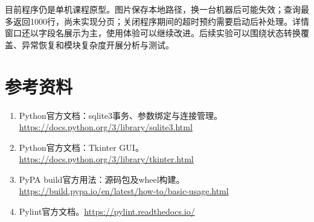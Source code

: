 \documentclass[11pt,a4paper]{ctexart}
\begin{document}
目前程序仍是单机课程原型。图片保存本地路径，换一台机器后可能失效；查询最多返回1000行，尚未实现分页；关闭程序期间的超时预约需要启动后补处理。详情窗口还以字段名展示为主，使用体验可以继续改进。后续实验可以围绕状态转换覆盖、异常恢复和模块复杂度开展分析与测试。

\section*{参考资料}
\begin{enumerate}
\item Python官方文档：sqlite3事务、参数绑定与连接管理。\url{https://docs.python.org/3/library/sqlite3.html}
\item Python官方文档：Tkinter GUI。\url{https://docs.python.org/3/library/tkinter.html}
\item PyPA build官方用法：源码包及wheel构建。\url{https://build.pypa.io/en/latest/how-to/basic-usage.html}
\item Pylint官方文档。\url{https://pylint.readthedocs.io/}
\end{enumerate}
\end{document}
